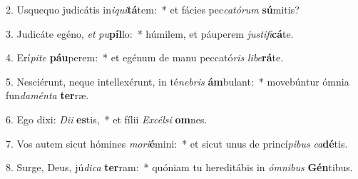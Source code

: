 2. Usquequo judicátis in\textit{i}\textit{qui}\textbf{tá}tem:~*  et fácies pec\textit{ca}\textit{tó}\textit{rum} \textbf{sú}mitis?\

3. Judicáte egéno, \textit{et} \textit{pu}\textbf{píl}lo:~*  húmilem, et páuperem \textit{jus}\textit{ti}\textit{fi}\textbf{cá}te.\

4. Erí\textit{pi}\textit{te} \textbf{páu}perem:~*  et egénum de manu peccató\textit{ris} \textit{li}\textit{be}\textbf{rá}te.\

5. Nesciérunt, neque intellexérunt, in té\textit{ne}\textit{bris} \textbf{ám}bulant:~*  movebúntur ómnia fun\textit{da}\textit{mén}\textit{ta} \textbf{ter}ræ.\

6. Ego dixi: \textit{Di}\textit{i} \textbf{es}tis,~*  et fílii \textit{Ex}\textit{cél}\textit{si} \textbf{om}nes.\

7. Vos autem sicut hómines \textit{mo}\textit{ri}\textbf{é}mini:~*  et sicut unus de princí\textit{pi}\textit{bus} \textit{ca}\textbf{dé}tis.\

8. Surge, Deus, jú\textit{di}\textit{ca} \textbf{ter}ram:~*  quóniam tu hereditábis in \textit{óm}\textit{ni}\textit{bus} \textbf{Gén}tibus.\

